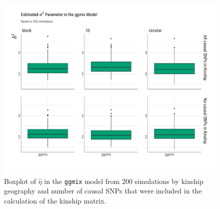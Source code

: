 \documentclass[12pt,letter]{article}\usepackage[]{graphicx}\usepackage[]{color}
\newenvironment{knitrout}{}{} %
\begin{document}
\begin{knitrout}\scriptsize
{}\color{fgcolor}\begin{figure}[H]

{\centering \includegraphics[width=1\linewidth]{figure/plot-sigma2-sim-1} 

}

\caption[Boxplot of $\hat{\eta}$ in the \texttt{ggmix} model from 200 simulations by kinship geography and number of causal SNPs that were included in the calculation of the kinship matrix]{Boxplot of $\hat{\eta}$ in the \texttt{ggmix} model from 200 simulations by kinship geography and number of causal SNPs that were included in the calculation of the kinship matrix.}\label{fig:plot-sigma2-sim}
\end{figure}


\end{knitrout}
\end{document}
